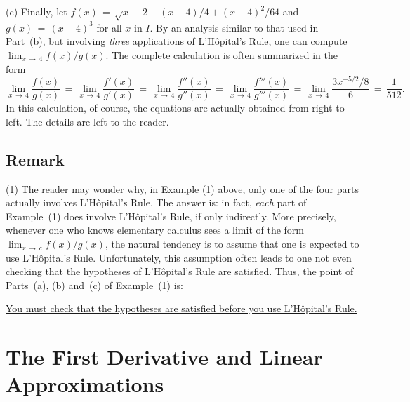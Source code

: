 {        (c) Finally, let $f(x) \,=\, \sqrt{x}-2-(x-4)/4+(x-4)^{2}/64$ and $g(x) \,=\, (x-4)^{3}$ for all $x$ in $I$.
    By an analysis similar to that used in Part~(b), but involving {\em three} applications of L'H\^{o}pital's Rule, one can compute $\lim_{x \,{\rightarrow}\, 4} f(x)/g(x)$.
    The complete calculation is often summarized in the form
        \begin{displaymath}
         \lim_{x \,{\rightarrow}\, 4} \frac{f(x)}{g(x)}\,=\, \lim_{x \,{\rightarrow}\, 4} \frac{f'(x)}{g'(x)} \,=\, \lim_{x \,{\rightarrow}\, 4} \frac{f''(x)}{g''(x)} \,=\, \lim_{x \,{\rightarrow}\, 4} \frac{f'''(x)}{g'''(x)} \,=\, \lim_{x \,{\rightarrow}\, 4} \frac{3x^{-5/2}/8}{6} \,=\, \frac{1}{512}.
        \end{displaymath}
    In this calculation, of course, the equations are actually obtained from right to left.
    The details are left to the reader.

\V

            \subsection{\small{\bf Remark}}
            \label{RemrkE50.95}

\V

\hspace*{\parindent}
        (1) The  reader may wonder why, in Example (1) above, only one of the four parts actually involves L'H\^{o}pital's Rule.
    The answer is: in fact, {\em each} part of Example~(1) does involve L'H\^{o}pital's Rule, if only indirectly.
    More precisely, whenever one who knows elementary calculus sees a limit of the form ${\displaystyle \lim_{x \,{\rightarrow}\, c} f(x)/g(x)}$,
    the natural tendency is to assume that one is expected to use L'H\^{o}pital's Rule.
    Unfortunately, this assumption often leads to one not even checking that the hypotheses of L'H\^{o}pital's Rule are satisfied.
    Thus, the point of Parts~(a), (b) and~(c) of Example~(1) is:

        \underline{You must check that the hypotheses are satisfied before you use L'H\^{o}pital's Rule.}

}%

\V
\V

                \section{{\bf The First Derivative and Linear Approximations}}
                \label{SectE55}

